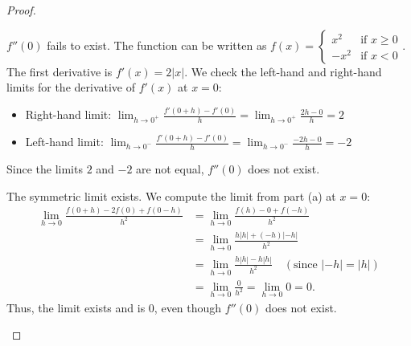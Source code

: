 \documentclass[11pt]{article}
\renewcommand{\_}[1]{\underline{ #1 }}
\theoremstyle{definition}
\numberwithin{equation}{subsection}
\begin{document}
\begin{proof}
\begin{enumerate}
$f''(0)$ fails to exist. The function can be written as $f(x) = \begin{cases} x^2 & \text{if } x \ge 0 \\ -x^2 & \text{if } x < 0 \end{cases}$.
The first derivative is $f'(x) = 2|x|$.
We check the left-hand and right-hand limits for the derivative of $f'(x)$ at $x=0$:
\begin{itemize}
    \item Right-hand limit: $\displaystyle \lim_{h \to 0^+} \frac{f'(0+h) - f'(0)}{h} = \lim_{h \to 0^+} \frac{2h - 0}{h} = 2$
    \item Left-hand limit: $\displaystyle \lim_{h \to 0^-} \frac{f'(0+h) - f'(0)}{h} = \lim_{h \to 0^-} \frac{-2h - 0}{h} = -2$
\end{itemize}
Since the limits $2$ and $-2$ are not equal, $f''(0)$ does not exist.

The symmetric limit exists.
We compute the limit from part (a) at $x=0$:
\begin{align*}
\lim_{h \to 0} \frac{f(0 + h) - 2f(0) + f(0 - h)}{h^2}
&= \lim_{h \to 0} \frac{f(h) - 0 + f(-h)}{h^2} \\
&= \lim_{h \to 0} \frac{h|h| + (-h)|-h|}{h^2} \\
&= \lim_{h \to 0} \frac{h|h| - h|h|}{h^2} \quad (\text{since } |-h| = |h|) \\
&= \lim_{h \to 0} \frac{0}{h^2} = \lim_{h \to 0} 0 = 0.
\end{align*}
Thus, the limit exists and is $0$, even though $f''(0)$ does not exist.
    
    \end{enumerate}


\end{proof}
\end{document}
